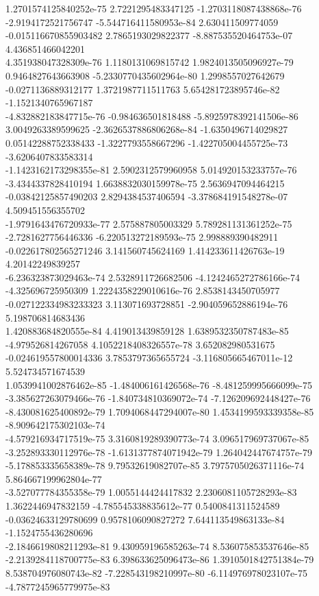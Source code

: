 \documentclass[11pt,titlepage,dvipdfmx,twoside]{article}
\begin{document}
\begin{oframed}
1.2701574125840252e-75 2.7221295483347125 -1.2703118087438868e-76 -2.9194172521756747 -5.544716411580953e-84 2.630411509774059 -0.015116670855903482 2.7865193029822377 -8.887535520464753e-07 4.436851466042201 \\
4.351938047328309e-76 1.1180131069815742 1.9824013505096927e-79 0.9464827643663908 -5.2330770435602964e-80 1.2998557027642679 -0.0271136889312177 1.3721987711511763 5.654281723895746e-82 -1.1521340765967187 \\
-4.832882183847715e-76 -0.984636501818488 -5.8925978392141506e-86 3.0049263389599625 -2.3626537886806268e-84 -1.6350496714029827 0.05142288752338433 -1.3227793558667296 -1.422705004455725e-73 -3.6206407833583314 \\
-1.1423162173298355e-81 2.5902312579960958 5.014920153233757e-76 -3.4344337828410194 1.6638832030159978e-75 2.5636947094464215 -0.03842125857490203 2.8294384537406594 -3.378684191548278e-07 4.509451556355702 \\
-1.9791643476720933e-77 2.575887805003329 5.789281131361252e-75 -2.7281627756446336 -6.220513272189593e-75 2.998889390482911 -0.022617802565271246 3.141560745624169 1.414233611426763e-19 4.20142249839257 \\
-6.236323873029463e-74 2.5328911726682506 -4.1242465272786166e-74 -4.325696725950309 1.2224358229010616e-76 2.8538143450705977 -0.027122334983233323 3.113071693728851 -2.904059652886194e-76 5.198706814683436 \\
1.420883684820555e-84 4.419013439859128 1.6389532350787483e-85 -4.979526814267058 4.1052218408326557e-78 3.652082980531675 -0.024619557800014336 3.7853797365655724 -3.116805665467011e-12 5.524734571674539 \\
1.0539941002876462e-85 -1.484006161426568e-76 -8.481259995666099e-75 -3.385627263079466e-76 -1.840734810369072e-74 -7.126209692448427e-76 -8.430081625400892e-79 1.7094068447294007e-80 1.4534199593339358e-85 -8.909642175302103e-74 \\
-4.579216934717519e-75 3.3160819289390773e-74 3.096517969737067e-85 -3.252893330112976e-78 -1.6131377874071942e-79 1.264042447674757e-79 -5.178853335658389e-78 9.79532619082707e-85 3.7975705026371116e-74 5.864667199962804e-77 \\
-3.527077784355358e-79 1.0055144424417832 2.2306081105728293e-83 1.3622446947832159 -4.785545338835612e-77 0.5400841311524589 -0.03624633129780699 0.9578106090827272 7.644113549863133e-84 -1.1524755436280696 \\
-2.1846619808211293e-81 9.430959196585263e-74 8.536075853537646e-85 -2.2139284118700775e-83 6.398633625096473e-86 1.3910501842751384e-79 8.538704976080743e-82 -7.228543198210997e-80 -6.114976978023107e-75 -4.7877245965779975e-83 \\

\end{oframed}
\end{document}
